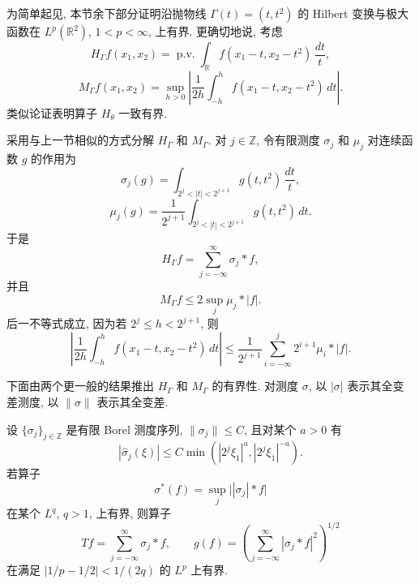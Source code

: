 为简单起见, 本节余下部分证明沿抛物线 $\Gamma(t)=(t,t^2)$ 的 Hilbert 变换与极大函数在 $L^p(\mathbb R^2)$, $1<p<\infty$, 上有界. 更确切地说, 考虑
\[
 H_\Gamma f(x_1,x_2)=\operatorname{p.v.}\int_{\mathbb R}
 f(x_1-t,x_2-t^2)\,\frac{dt}{t},
\]
\[
 M_\Gamma f(x_1,x_2)=\sup_{h>0}\left|\frac1{2h}
 \int_{-h}^hf(x_1-t,x_2-t^2)\,dt\right|.
\]
类似论证表明算子 $H_\theta$ 一致有界.

\hypertarget{chapter-08-page-192}{}
采用与上一节相似的方式分解 $H_\Gamma$ 和 $M_\Gamma$. 对 $j\in\mathbb Z$, 令有限测度 $\sigma_j$ 和 $\mu_j$ 对连续函数 $g$ 的作用为
\begin{equation}
 \sigma_j(g)=\int_{2^j<|t|<2^{j+1}}g(t,t^2)\,\frac{dt}{t},
 \label{eq:ch8-parabola-sigma-measure}
\end{equation}
\begin{equation}
 \mu_j(g)=\frac1{2^{j+1}}
 \int_{2^j<|t|<2^{j+1}}g(t,t^2)\,dt.
 \label{eq:ch8-parabola-mu-measure}
\end{equation}
于是
\begin{equation}
 H_\Gamma f=\sum_{j=-\infty}^{\infty}\sigma_j*f,
 \label{eq:ch8-parabola-hilbert-decomposition}
\end{equation}
并且
\begin{equation}
 M_\Gamma f\le2\sup_j\mu_j*|f|.
 \label{eq:ch8-parabola-maximal-decomposition}
\end{equation}
后一不等式成立, 因为若 $2^j\le h<2^{j+1}$, 则
\[
 \left|\frac1{2h}\int_{-h}^hf(x_1-t,x_2-t^2)\,dt\right|
 \le\frac1{2^{j+1}}\sum_{i=-\infty}^j2^{i+1}\mu_i*|f|.
\]

下面由两个更一般的结果推出 $H_\Gamma$ 和 $M_\Gamma$ 的有界性. 对测度 $\sigma$, 以 $|\sigma|$ 表示其全变差测度, 以 $\|\sigma\|$ 表示其全变差.

\begin{Theorem}
\label{thm:ch8-measure-sequence-operators}
设 $\{\sigma_j\}_{j\in\mathbb Z}$ 是有限 Borel 测度序列, $\|\sigma_j\|\le C$, 且对某个 $a>0$ 有
\begin{equation}
 |\widehat\sigma_j(\xi)|
 \le C\min(|2^j\xi_1|^a,|2^j\xi_1|^{-a}).
 \label{eq:ch8-measure-fourier-two-sided}
\end{equation}
若算子
\[
 \sigma^*(f)=\sup_j\bigl||\sigma_j|*f\bigr|
\]
在某个 $L^q$, $q>1$, 上有界, 则算子
\[
 Tf=\sum_{j=-\infty}^{\infty}\sigma_j*f,
 \qquad
 g(f)=\left(\sum_{j=-\infty}^{\infty}|\sigma_j*f|^2\right)^{1/2}
\]
在满足 $|1/p-1/2|<1/(2q)$ 的 $L^p$ 上有界.
\end{Theorem}


